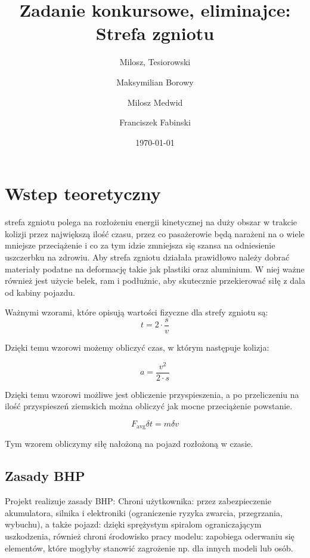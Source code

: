 \documentclass[a4paper,12pt]{article}  %
\title{Zadanie konkursowe, eliminajce:\\ Strefa zgniotu}
\author{
  Milosz, Tesiorowski\\
  \and
  Maksymilian Borowy\\
  \and
  Milosz Medwid\\
  \and
  Franciszek Fabinski\\
}
\date{\today}
\begin{document}
\maketitle  %

% 
% 

\section{Wstep teoretyczny}
strefa zgniotu polega na rozłożeniu energii kinetycznej na duży obszar w
trakcie kolizji przez największą ilość czasu, przez co pasażerowie będą 
narażeni na o wiele mniejsze przeciążenie i co za tym idzie zmniejsza się szansa 
na odniesienie uszczerbku na zdrowiu. Aby strefa zgniotu działała prawidłowo należy 
dobrać materiały podatne na deformację takie jak plastiki oraz aluminium. W niej ważne 
również jest użycie belek, ram i podłużnic, aby skutecznie przekierować siłę z dala od kabiny pojazdu.

Ważnymi wzorami, które opisują wartości fizyczne dla strefy zgniotu są:
\begin{equation}
  t = 2 \cdot \frac{s}{v}
\end{equation}

Dzięki temu wzorowi możemy obliczyć czas, w którym następuje kolizja:

\begin{equation}
  a = \frac{v^2}{2 \cdot s}
\end{equation}

Dzięki temu wzorowi możliwe jest obliczenie przyspieszenia, a po przeliczeniu na ilość przyspieszeń ziemskich można obliczyć jak mocne przeciążenie powstanie.

\begin{equation}
  F_{\text{avg}} \delta t = m \delta v
\end{equation}

Tym wzorem obliczymy siłę nałożoną na pojazd rozłożoną w czasie.


\subsection{Zasady BHP}

Projekt realizuje zasady BHP:
Chroni użytkownika: przez zabezpieczenie akumulatora, silnika i elektroniki (ograniczenie ryzyka zwarcia, przegrzania, wybuchu), a także pojazd: dzięki sprężystym spiralom ograniczającym uszkodzenia, również chroni środowisko pracy modelu: zapobiega oderwaniu się elementów, które mogłyby stanowić zagrożenie np. dla innych modeli lub osób.
\end{document}

